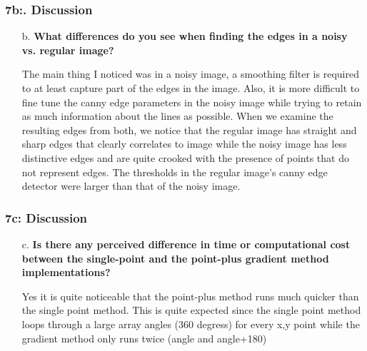 	\begin{frame}[t]
		\frametitle{7b:. Discussion}
		
		\begin{normalsize}
			\begin{itemize}
				\setlength\itemsep{1em}
				
				\item[b.] \textbf{What differences do you see when finding the edges in a noisy vs. regular image?}
				
				\item[] The main thing I noticed was in a noisy image, a smoothing filter is required to at least capture part of the edges in the image. Also, it is more difficult to fine tune the canny edge parameters in the noisy image while trying to retain as much information about the lines as possible. When we examine the resulting edges from both, we notice that the regular image has straight and sharp edges that clearly correlates to image while the noisy image has less distinctive edges and are quite crooked with the presence of points that do not represent edges. The thresholds in the regular image's canny edge detector were larger than that of the noisy image.
				
			\end{itemize}
		\end{normalsize}
		
	\end{frame}

	\begin{frame}[t]
		\frametitle{7c: Discussion}
		
		\begin{normalsize}
			\begin{itemize}
				\setlength\itemsep{1em}
				
				\item[c.] \textbf{Is there any perceived difference in time or computational cost between the single-point and the point-plus gradient method implementations?}

				\item[] Yes it is quite noticeable that the point-plus method runs much quicker than the single point method. This is quite expected since the single point method loops through a large array angles (360 degress) for every x,y point while the gradient method only runs twice (angle and angle+180) 
				
			\end{itemize}
		\end{normalsize}
		
	\end{frame}
    
